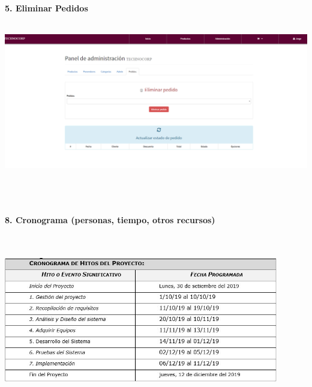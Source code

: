 \begin{flushleft}
\begin{itemize}
\textbf{ }\\
\textbf{ }\\
\textbf{ }\\
\textbf{ }\\
\textbf{ }\\
\textbf{ }\\
\textbf{ }\\
\textbf{ }\\
\textbf{ }\\
\textbf{ }\\
\textbf{ }\\
\textbf{5. Eliminar Pedidos}\\
\textbf{ }\\
\begin{center}
	\includegraphics[width=18cm]{./Imagenes/back4} 
\end{center}
\textbf{ }\\
\textbf{ }\\


\textbf{ }\\
\textbf{8.      Cronograma (personas, tiempo, otros recursos) }\\
\textbf{ }\\

\textbf{ }\\
\begin{center}
	\includegraphics[width=12cm]{./Imagenes/cronograma} 
	\end{center}
\textbf{ }\\
\textbf{ }\\
\textbf{ }\\


\end{itemize}
\end{flushleft}
